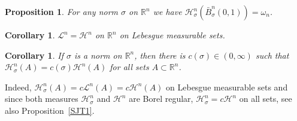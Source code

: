 \documentclass[12pt,leqno]{amsart}
\newtheorem{corollary}[theorem]{Corollary}
\newtheorem{proposition}[theorem]{Proposition}
\theoremstyle{definition}
\newcommand{\bbbr}{\mathbb R}
\def\H{{\mathcal H}}
\def\LL{{\mathcal L}}
\numberwithin{theorem}{section} \numberwithin{equation}{section}
\begin{document}
\begin{proposition}
\label{AT5}
For any norm $\sigma$ on $\bbbr^n$ we have $\H^n_\sigma(\bar{B}^n_\sigma(0,1))=\omega_n$.
\end{proposition}
\begin{corollary}
\label{SJT2}
$\LL^n=\H^n$ on $\bbbr^n$ on Lebesgue measurable sets.
\end{corollary}
\begin{corollary}
\label{AT12}
If $\sigma$ is a norm on $\bbbr^n$, then there is $c(\sigma)\in (0,\infty)$ such that $\H^n_\sigma(A)=c(\sigma)\H^n(A)$ for all sets $A\subset\bbbr^n$.
\end{corollary}
Indeed, $\H^n_\sigma(A)=c\LL^n(A)=c\H^n(A)$ on Lebesgue measurable sets and since both measures $\H^n_\sigma$ and $\H^n$ are Borel regular, $\H^n_\sigma=c\H^n$ on all sets, see also Proposition~\ref{SJT1}.
\end{document}
